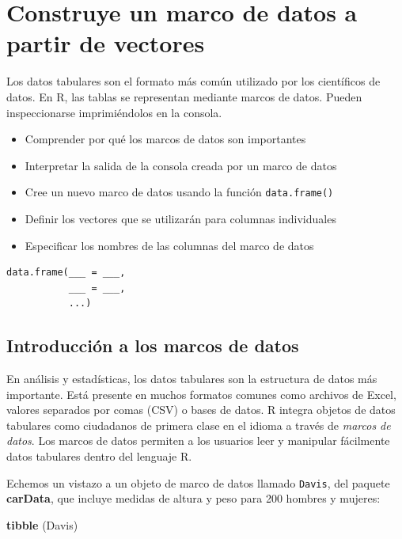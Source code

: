\documentclass[
]{book}
\newenvironment{Shaded}{\begin{snugshade}}{\end{snugshade}}
\newcommand{\KeywordTok}[1]{\textcolor[rgb]{0.13,0.29,0.53}{\textbf{#1}}}
\newcommand{\NormalTok}[1]{#1}
\providecommand{\tightlist}{%
  \setlength{\itemsep}{0pt}\setlength{\parskip}{0pt}}
\begin{document}
\hypertarget{construye-un-marco-de-datos-a-partir-de-vectores}{%
\section{Construye un marco de datos a partir de vectores}\label{construye-un-marco-de-datos-a-partir-de-vectores}}

Los datos tabulares son el formato más común utilizado por los científicos de datos. En R, las tablas se representan mediante marcos de datos. Pueden inspeccionarse imprimiéndolos en la consola.

\begin{itemize}
\tightlist
\item
  Comprender por qué los marcos de datos son importantes
\item
  Interpretar la salida de la consola creada por un marco de datos
\item
  Cree un nuevo marco de datos usando la función \texttt{data.frame()}
\item
  Definir los vectores que se utilizarán para columnas individuales
\item
  Especificar los nombres de las columnas del marco de datos
\end{itemize}

\begin{verbatim}
data.frame(___ = ___, 
           ___ = ___, 
           ...)
\end{verbatim}

\hypertarget{introducciuxf3n-a-los-marcos-de-datos}{%
\subsection{Introducción a los marcos de datos}\label{introducciuxf3n-a-los-marcos-de-datos}}

En análisis y estadísticas, los datos tabulares son la estructura de datos más importante. Está presente en muchos formatos comunes como archivos de Excel, valores separados por comas (CSV) o bases de datos. R integra objetos de datos tabulares como ciudadanos de primera clase en el idioma a través de \emph{marcos de datos}. Los marcos de datos permiten a los usuarios leer y manipular fácilmente datos tabulares dentro del lenguaje R.

Echemos un vistazo a un objeto de marco de datos llamado \texttt{Davis}, del paquete \textbf{carData}, que incluye medidas de altura y peso para 200 hombres y mujeres:

\begin{Shaded}
\begin{Highlighting}[]
\KeywordTok{tibble}\NormalTok{ (Davis)}
\end{Highlighting}
\end{Shaded}
\end{document}
